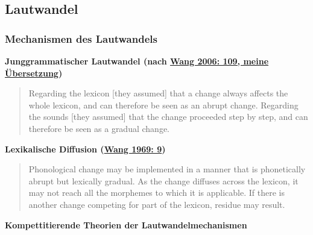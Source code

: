 \subsection{\texorpdfstring{{Lautwandel}}{Lautwandel}}

\subsubsection{\texorpdfstring{{Mechanismen des
Lautwandels}}{Mechanismen des Lautwandels}}

\vspace{0.5cm}\par\noindent\textbf{Junggrammatischer Lautwandel (nach\vspace{0.5cm}
\href{http://bibliography.lingpy.org?key=Wang2006a}{Wang 2006: 109,
meine Übersetzung})}

\begin{quote}
Regarding the lexicon {[}they assumed{]} that a change always affects
the whole lexicon, and can therefore be seen as an abrupt change.
Regarding the sounds {[}they assumed{]} that the change proceeded step
by step, and can therefore be seen as a gradual change.
\end{quote}


\vspace{0.5cm}\par\noindent\textbf{Lexikalische Diffusion\vspace{0.5cm}
(\href{http://bibliography.lingpy.org?key=Wang1969}{Wang 1969: 9})}

\begin{quote}
Phonological change may be implemented in a manner that is phonetically
abrupt but lexically gradual. As the change diffuses across the lexicon,
it may not reach all the morphemes to which it is applicable. If there
is another change competing for part of the lexicon, residue may result.
\end{quote}

\vspace{0.5cm}\par\noindent\textbf{Kompettitierende Theorien der Lautwandelmechanismen}\vspace{0.5cm}


